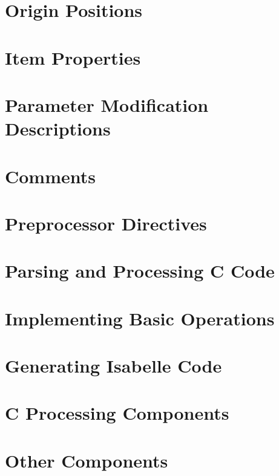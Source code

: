 \documentclass[a4paper]{report}
\begin{document}
\section{Origin Positions}
\label{impl-origin}


\section{Item Properties}
\label{impl-itemprops}


\section{Parameter Modification Descriptions}
\label{impl-parmod}


\section{Comments}
\label{impl-comments}


\section{Preprocessor Directives}
\label{impl-preprocessor}


\section{Parsing and Processing C Code}
\label{impl-ccode}


\section{Implementing Basic Operations}
\label{impl-operations}


\section{Generating Isabelle Code}
\label{impl-isabelle}


\section{C Processing Components}
\label{impl-ccomps}


\section{Other Components}
\label{impl-ocomps}

\end{document}
